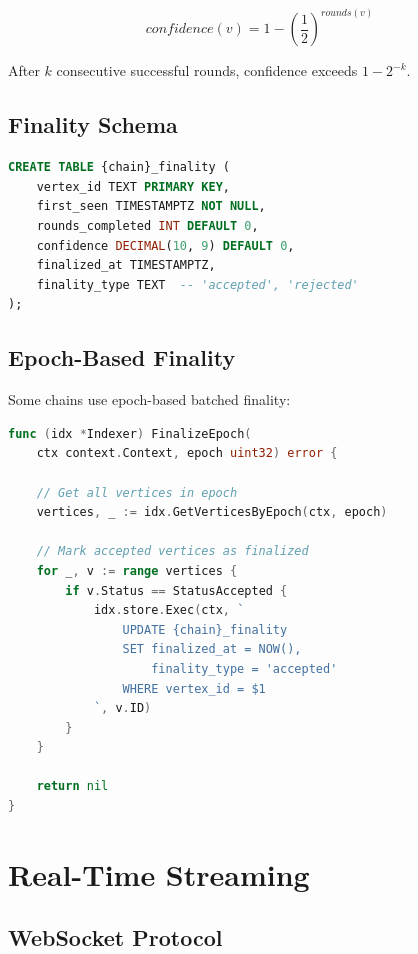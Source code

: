 \documentclass[11pt,twocolumn]{article}
\begin{document}
\begin{equation}
confidence(v) = 1 - \left(\frac{1}{2}\right)^{rounds(v)}
\end{equation}

After $k$ consecutive successful rounds, confidence exceeds $1 - 2^{-k}$.

\subsection{Finality Schema}

\begin{lstlisting}[language=SQL,caption={Finality tracking schema}]
CREATE TABLE {chain}_finality (
    vertex_id TEXT PRIMARY KEY,
    first_seen TIMESTAMPTZ NOT NULL,
    rounds_completed INT DEFAULT 0,
    confidence DECIMAL(10, 9) DEFAULT 0,
    finalized_at TIMESTAMPTZ,
    finality_type TEXT  -- 'accepted', 'rejected'
);
\end{lstlisting}

\subsection{Epoch-Based Finality}

Some chains use epoch-based batched finality:

\begin{lstlisting}[language=Go,caption={Epoch finality tracking}]
func (idx *Indexer) FinalizeEpoch(
    ctx context.Context, epoch uint32) error {

    // Get all vertices in epoch
    vertices, _ := idx.GetVerticesByEpoch(ctx, epoch)

    // Mark accepted vertices as finalized
    for _, v := range vertices {
        if v.Status == StatusAccepted {
            idx.store.Exec(ctx, `
                UPDATE {chain}_finality
                SET finalized_at = NOW(),
                    finality_type = 'accepted'
                WHERE vertex_id = $1
            `, v.ID)
        }
    }

    return nil
}
\end{lstlisting}

\section{Real-Time Streaming}

\subsection{WebSocket Protocol}
\end{document}
